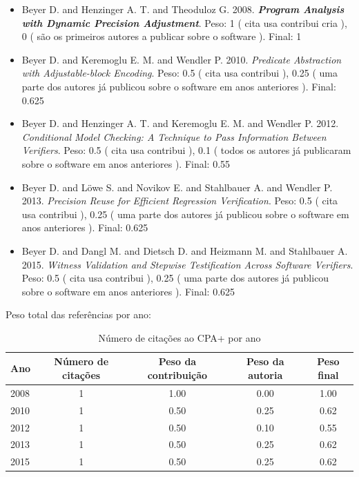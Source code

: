 \begin{itemize}
\item Beyer D. and Henzinger A. T. and Theoduloz G.
      2008.
        \textbf{\textit{ Program Analysis with Dynamic Precision Adjustment}}.
      Peso:
      1 (
          cita
          usa
          contribui
          cria
      ),
      0 (
são os primeiros autores a publicar sobre o software
      ).
      Final:
      1

\item Beyer D. and Keremoglu E. M. and Wendler P.
      2010.
        \textit{ Predicate Abstraction with Adjustable-block Encoding}.
      Peso:
      0.5 (
          cita
          usa
          contribui
      ),
      0.25 (
uma parte dos autores já publicou sobre o software em anos anteriores
      ).
      Final:
      0.625

\item Beyer D. and Henzinger A. T. and Keremoglu E. M. and Wendler P.
      2012.
        \textit{ Conditional Model Checking: A Technique to Pass Information Between Verifiers}.
      Peso:
      0.5 (
          cita
          usa
          contribui
      ),
      0.1 (
todos os autores já publicaram sobre o software em anos anteriores
      ).
      Final:
      0.55

\item Beyer D. and L\"{o}we S. and Novikov E. and Stahlbauer A. and Wendler P.
      2013.
        \textit{ Precision Reuse for Efficient Regression Verification}.
      Peso:
      0.5 (
          cita
          usa
          contribui
      ),
      0.25 (
uma parte dos autores já publicou sobre o software em anos anteriores
      ).
      Final:
      0.625

\item Beyer D. and Dangl M. and Dietsch D. and Heizmann M. and Stahlbauer A.
      2015.
        \textit{ Witness Validation and Stepwise Testification Across Software Verifiers}.
      Peso:
      0.5 (
          cita
          usa
          contribui
      ),
      0.25 (
uma parte dos autores já publicou sobre o software em anos anteriores
      ).
      Final:
      0.625

\end{itemize}

Peso total das referências por ano:

\begin{table}[h]
\caption{Número de citações ao CPA+  por ano}
\centering
\begin{tabular}{| l | c | c | c | c |}
  \hline
  Ano & Número de citações & Peso da contribuição & Peso da autoria & Peso final \\
  \hline
  2008
    & 1
    & 1.00
    & 0.00
    & 1.00 \\
  2010
    & 1
    & 0.50
    & 0.25
    & 0.62 \\
  2012
    & 1
    & 0.50
    & 0.10
    & 0.55 \\
  2013
    & 1
    & 0.50
    & 0.25
    & 0.62 \\
  2015
    & 1
    & 0.50
    & 0.25
    & 0.62 \\
  \hline
\end{tabular}
\end{table}


